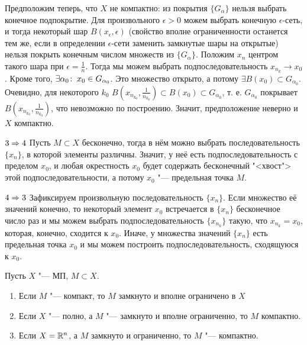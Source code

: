 \documentclass[main]{subfiles}
\begin{document}
\begin{itemproof}
  Предположим теперь, что \( X \) не компактно:
  из покрытия \( \{ G_\alpha \} \) нельзя выбрать конечное
  подпокрытие. Для произвольного \( \epsilon > 0 \)
  можем выбрать конечную \( \epsilon \)-сеть,
  и тогда некоторый шар \( B(x_\epsilon, \epsilon) \)
  (свойство вполне ограниченности останется тем же,
  если в определении \( \epsilon \)-сети заменить
  замкнутые шары на открытые)
  нельзя покрыть конечным числом множеств из \( \{ G_\alpha \} \).
  Положим \( x_n \) центром такого шара при \( \epsilon = \frac{1}{n} \).
  Тогда мы можем выбрать подпоследовательность
  \( x_{n_k} \to x_0 \). Кроме того, \( \exists \alpha_0 \colon \: x_0 \in G_{\alpha_0} \).
  Это множество открыто, а потому \( \exists B(x_0) \subset G_{\alpha_0} \).
  Очевидно, для некоторого \( k_0 \)
  \( B(x_{n_{k_0}}, \frac{1}{n_{k_0}}) \subset B(x_0)
  \subset G_{\alpha_0} \),
  т. е. \( G_{\alpha_0} \) покрывает
  \( B(x_{n_{k_0}}, \frac{1}{n_{k_0}}) \), что невозможно по построению.
  Значит, предположение неверно и \( X \) компактно.
\item[$3 \Rightarrow 4$]
  Пусть \( M \subset X \) бесконечно, тогда
  в нём можно выбрать последовательность
  \( \{ x_n \} \), в которой элементы различны.
  Значит, у неё есть подпоследовательность с пределом
  \( x_0 \), и любая окрестность \( x_0 \) будет
  содержать бесконечный "<хвост"> этой подпоследовательности,
  а потому \( x_0 \) "--- предельная точка \( M \).
\item[$4 \Rightarrow 3$]
  Зафиксируем произвольную последовательность \( \{ x_n \} \).
  Если множество её значений конечно, то некоторый
  элемент \( x_0 \) встречается в \( \{ x_n \} \)
  бесконечное число раз и мы можем выбрать
  подпоследовательность \( \{ x_{n_k} \} \)
  такую, что \( x_{n_k} = x_0 \),
  которая, конечно, сходится к \( x_0 \).
  Иначе, у множества значений \( \{ x_n \} \)
  есть предельная точка \( x_0 \)
  и мы можем построить подпоследовательность,
  сходящуюся к \( x_0 \).
\end{itemproof}

\begin{corollary}
  Пусть \( X \) "--- МП, \( M \subset X \).
  \begin{enumerate}
    \item Если \( M \) "--- компакт,
      то \( M \) замкнуто и вполне ограничено в \( X \)
    \item Если \( X \) "--- полно, а \( M \) "---
      замкнуто и вполне ограниченно, то \( M \) компактно.
    \item Если \( X = \mathbb{R}^n \), а \( M \)
      замкнуто и ограниченно, то \( M \) "--- компактно.
  \end{enumerate}
\end{corollary}
\end{document}

